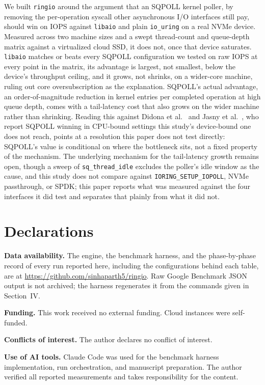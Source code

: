 \documentclass[conference]{IEEEtran}
\begin{document}
We built \texttt{ringio} around the argument that an SQPOLL kernel poller, by removing the
per-operation syscall other asynchronous I/O interfaces still pay, should win on IOPS against
\texttt{libaio} and plain \texttt{io\_uring} on a real NVMe device. Measured across two machine
sizes and a swept thread-count and queue-depth matrix against a virtualized cloud SSD, it does
not, once that device saturates. \texttt{libaio} matches or beats every SQPOLL configuration we
tested on raw IOPS at every point in the matrix, its advantage is largest, not smallest, below
the device's throughput ceiling, and it grows, not shrinks, on a wider-core machine, ruling out
core oversubscription as the explanation. SQPOLL's actual advantage, an order-of-magnitude
reduction in kernel entries per completed operation at high queue depth, comes with a
tail-latency cost that also grows on the wider machine rather than shrinking. Reading this
against Didona et al.~\cite{didona2022} and Jasny et al.~\cite{jasny2025}, who report SQPOLL
winning in CPU-bound settings this study's device-bound one does not reach, points at a
resolution this paper does not test directly: SQPOLL's value is conditional on where the
bottleneck sits, not a fixed property of the mechanism. The underlying mechanism for the
tail-latency growth remains open, though a sweep of \texttt{sq\_thread\_idle} excludes the
poller's idle window as the cause, and this study does not compare against
\texttt{IORING\_SETUP\_IOPOLL}, NVMe passthrough, or SPDK; this paper reports what was measured
against the four interfaces it did test and separates that plainly from what it did not.

\section*{Declarations}

\textbf{Data availability.} The engine, the benchmark harness, and the phase-by-phase record of
every run reported here, including the configurations behind each table, are at
\url{https://github.com/sinhaparth5/ringio}. Raw Google Benchmark JSON output is not archived;
the harness regenerates it from the commands given in Section~IV.

\textbf{Funding.} This work received no external funding. Cloud instances were self-funded.

\textbf{Conflicts of interest.} The author declares no conflict of interest.

\textbf{Use of AI tools.} Claude Code was used for the benchmark harness implementation, run
orchestration, and manuscript preparation. The author verified all reported measurements and
takes responsibility for the content.
\end{document}
